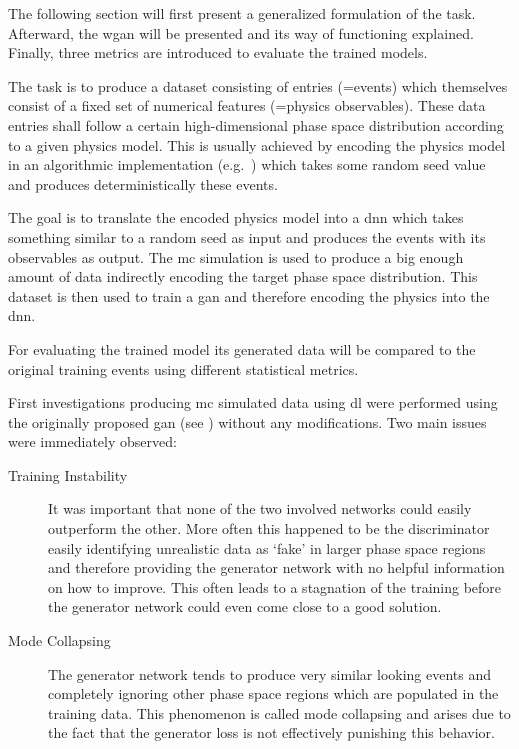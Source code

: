 The following section will first present a generalized formulation of the task. Afterward, the \gls{wgan} will be presented and its way of functioning explained. Finally, three metrics are introduced to evaluate the trained models.


The task is to produce a dataset consisting of entries (=events) which themselves consist of a fixed set of numerical features (=physics observables). These data entries shall follow a certain high-dimensional phase space distribution according to a given physics model. This is usually achieved by encoding the physics model in an algorithmic implementation (e.g.\ \geant{}) which takes some random seed value and produces deterministically these events.

The goal is to translate the encoded physics model into a \gls{dnn} which takes something similar to a random seed as input and produces the events with its observables as output. The \gls{mc} simulation is used to produce a big enough amount of data indirectly encoding the target phase space distribution. This dataset is then used to train a \gls{gan} and therefore encoding the physics into the \gls{dnn}.

For evaluating the trained model its generated data will be compared to the original training events using different statistical metrics.


First investigations producing \gls{mc} simulated data using \gls{dl} were performed using the originally proposed \gls{gan} (see ) without any modifications. Two main issues were immediately observed:

\begin{description}
\item[Training Instability] It was important that none of the two involved networks could easily outperform the other. More often this happened to be the discriminator easily identifying unrealistic data as `fake' in larger phase space regions and therefore providing the generator network with no helpful information on how to improve. This often leads to a stagnation of the training before the generator network could even come close to a good solution.
\item[Mode Collapsing] The generator network tends to produce very similar looking events and completely ignoring other phase space regions which are populated in the training data. This phenomenon is called mode collapsing and arises due to the fact that the generator loss is not effectively punishing this behavior.
\end{description}

